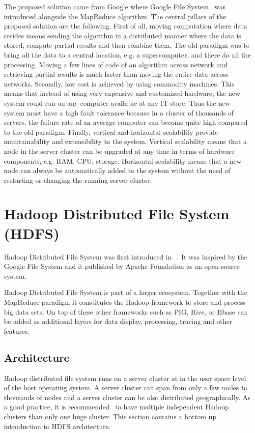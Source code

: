 \documentclass{sig-alternate}
\begin{document}
The proposed solution came from Google where Google File System~\cite{google1} was introduced alongside the MapReduce algorithm.
The central pillars of the proposed solution are the following.
First of all, moving computation where data resides means sending the algorithm in a distributed manner where the data is stored, compute partial results and then combine them. The old paradigm was to bring all the data to a central location, e.g. a supercomputer, and there do all the processing. Moving a few lines of code of an algorithm across network and retrieving partial results is much faster than moving the entire data across networks.
Secondly, low cost is achieved by using commodity machines. This means that instead of using very expensive and customized hardware, the new system could run on any computer available at any IT store. Thus the new system must have a high fault tolerance because in a cluster of thousands of servers, the failure rate of an average computer can become quite high compared to the old paradigm.
Finally, vertical and horizontal scalability provide maintainability and extensibility to the system. Vertical scalability means that a node in the server cluster can be upgraded at any time in terms of hardware components, e.g. RAM, CPU, storage. Horizontal scalability means that a new node can always be automatically added to the system without the need of restarting or changing the running server cluster.

\section{Hadoop Distributed File System (HDFS)}
Hadoop Distributed File System was first introduced in ~\cite{hadoop1}.
It was inspired by the Google File System and it published by Apache Foundation as an open-source system.

Hadoop Distributed File System is part of a larger ecosystem.
Together with the MapReduce paradigm it constitutes the Hadoop framework to store and process big data sets. On top of these other frameworks such as PIG, Hive, or Hbase can be added as additional layers for data display, processing, tracing and other features. 

\subsection{Architecture}
Hadoop distributed file system runs on a server cluster at in the user space level of the host operating system. A server cluster can span from only a few nodes to thousands of nodes and a server cluster can be also distributed geographically. As a good practice, it is recommended~\cite{hadoop1} to have multiple independent Hadoop clusters than only one huge cluster. This section contains a bottom up introduction to HDFS architecture. 
\end{document}
